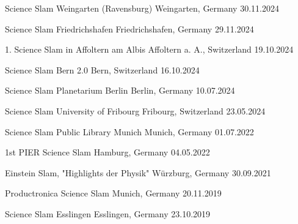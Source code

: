 \begin{cvhonors}
\cvhonor
{Science Slam Weingarten (Ravensburg)} %
{Weingarten, Germany} %
{} %
{30.11.2024} %

\cvhonor
{Science Slam Friedrichshafen} %
{Friedrichshafen, Germany} %
{} %
{29.11.2024} %

\cvhonor
{1. Science Slam in Affoltern am Albis} %
{Affoltern a. A., Switzerland} %
{} %
{19.10.2024} %

\cvhonor
{Science Slam Bern 2.0} %
{Bern, Switzerland} %
{} %
{16.10.2024} %

\cvhonor
{Science Slam Planetarium Berlin} %
{Berlin, Germany} %
{} %
{10.07.2024} %
  
\cvhonor
{Science Slam University of Fribourg} %
{Fribourg, Switzerland} %
{} %
{23.05.2024} %

\cvhonor
{Science Slam Public Library Munich} %
{Munich, Germany} %
{} %
{01.07.2022} %

\cvhonor
{1st PIER Science Slam} %
{Hamburg, Germany} %
{} %
{04.05.2022} %

\cvhonor
{Einstein Slam, "Highlights der Physik"} %
{Würzburg, Germany} %
{} %
{30.09.2021} %

\cvhonor
{Productronica Science Slam} %
{Munich, Germany} %
{} %
{20.11.2019} %

\cvhonor
{Science Slam Esslingen} %
{Esslingen, Germany} %
{} %
{23.10.2019} %


\end{cvhonors}
